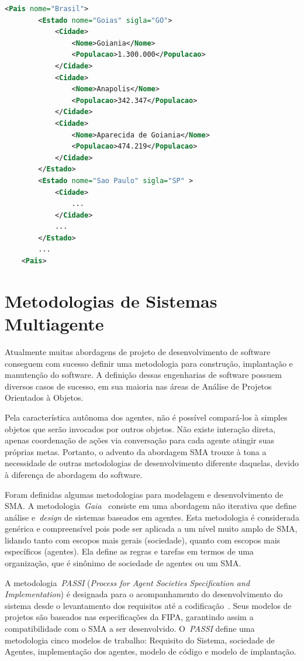 \begin{lstlisting}[language=xml,label=code:exemplo-xml,caption=Representação uma ontologia simples de cidades.]
	<Pais nome="Brasil">
		<Estado nome="Goias" sigla="GO">
			<Cidade>
				<Nome>Goiania</Nome>
				<Populacao>1.300.000</Populacao>
			</Cidade>
			<Cidade>
				<Nome>Anapolis</Nome>
				<Populacao>342.347</Populacao>
			</Cidade>
			<Cidade>
				<Nome>Aparecida de Goiania</Nome>
				<Populacao>474.219</Populacao>
			</Cidade>
		</Estado>
		<Estado nome="Sao Paulo" sigla="SP" >
			<Cidade>
				...
			</Cidade>
			...
		</Estado>
		...
	<Pais>
\end{lstlisting}

\section{Metodologias de Sistemas Multiagente}\label{section:mase}

Atualmente muitas abordagens de projeto de desenvolvimento de software conseguem com sucesso definir uma metodologia para construção, implantação e manutenção do software. A definição dessas engenharias de software possuem diversos casos de sucesso, em sua maioria nas áreas de Análise de Projetos Orientados à Objetos.

Pela característica autônoma dos agentes, não é possível compará-los à simples objetos que serão invocados por outros objetos. Não existe interação direta, apenas coordenação de ações via conversação para cada agente atingir suas próprias metas. Portanto, o advento da abordagem SMA trouxe à tona a necessidade de outras metodologias de desenvolvimento diferente daquelas, devido à diferença de abordagem do software.

Foram definidas algumas metodologias para modelagem e desenvolvimento de SMA. A metodologia~\emph{Gaia}~\cite{wooldridge2000} consiste em uma abordagem não iterativa que define análise e~\emph{design} de sistemas baseados em agentes. Esta metodologia é considerada genérica e compreensível pois pode ser aplicada a um nível muito amplo de SMA, lidando tanto com escopos mais gerais (sociedade), quanto com escopos mais específicos (agentes). Ela define as regras e tarefas em termos de uma organização, que é sinônimo de sociedade de agentes ou um SMA.

A metodologia~\emph{PASSI} (\emph{Process for Agent Societies Specification and Implementation}) é designada para o acompanhamento do desenvolvimento do sistema desde o levantamento dos requisitos até a codificação~\cite{burrafato02}. Seus modelos de projetos são baseados nas especificações da FIPA, garantindo assim a compatibilidade com o SMA a ser desenvolvido. O~\emph{PASSI} define uma metodologia cinco modelos de trabalho: Requisito do Sistema, sociedade de Agentes, implementação dos agentes, modelo de código e modelo de implantação.

